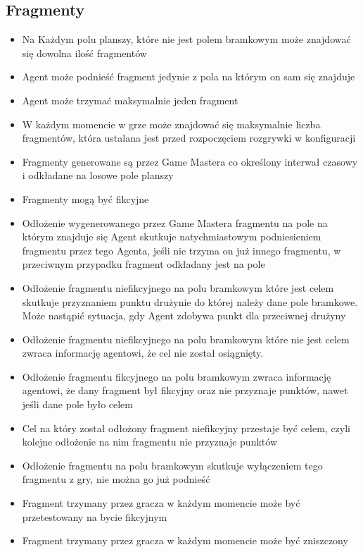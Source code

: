 \documentclass[Dokumentacja.tex]{subfiles}
\begin{document}
\subsection{Fragmenty}
\begin{itemize}
    \item Na Każdym polu planszy, które nie jest polem bramkowym może znajdować się dowolna ilość fragmentów
	\item Agent może podnieść fragment jedynie z pola na którym on sam się znajduje
    \item Agent może trzymać maksymalnie jeden fragment
    \item W każdym momencie w grze może znajdować się maksymalnie liczba fragmentów, która ustalana jest przed rozpoczęciem rozgrywki w konfiguracji
    \item Fragmenty generowane są przez Game Mastera co określony interwał czasowy i odkładane na losowe pole planszy
	\item Fragmenty mogą być fikcyjne
    \item Odłożenie wygenerowanego przez Game Mastera fragmentu na pole na którym znajduje się Agent skutkuje natychmiastowym podniesieniem fragmentu przez tego Agenta, jeśli nie trzyma on już innego fragmentu, w przeciwnym przypadku fragment odkładany jest na pole
    \item Odłożenie fragmentu niefikcyjnego na polu bramkowym które jest celem skutkuje przyznaniem punktu drużynie do której należy dane pole bramkowe. Może nastąpić sytuacja, gdy Agent zdobywa punkt dla przeciwnej drużyny
    \item Odłożenie fragmentu niefikcyjnego na polu bramkowym które nie jest celem zwraca informację agentowi, że cel nie został osiągnięty.
	\item Odłożenie fragmentu fikcyjnego na polu bramkowym zwraca informację agentowi, że dany fragment był fikcyjny oraz nie przyznaje punktów, nawet jeśli dane pole było celem
    \item Cel na który został odłożony fragment niefikcyjny przestaje być celem, czyli kolejne odłożenie na nim fragmentu nie przyznaje punktów
    \item Odłożenie fragmentu na polu bramkowym skutkuje wyłączeniem tego fragmentu z gry, nie można go już podnieść
    \item Fragment trzymany przez gracza w każdym momencie może być przetestowany na bycie fikcyjnym
    \item Fragment trzymany przez gracza w każdym momencie może być zniszczony
\end{itemize}
\end{document}

